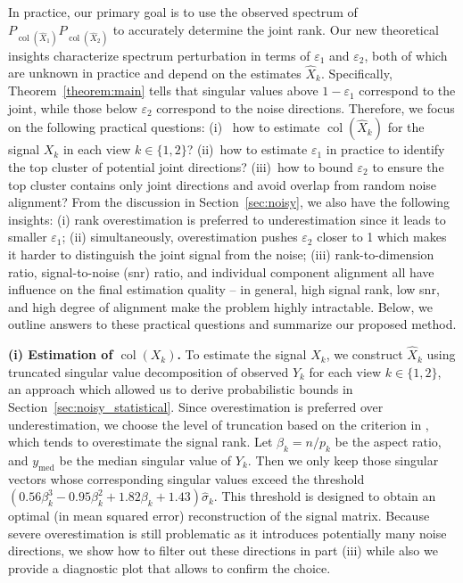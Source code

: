\documentclass{amsart}
\def\v{{\varepsilon}}
\DeclareMathOperator*{\col}{col}
\begin{document}
 In practice, our primary goal is to use the observed spectrum of $P_{\col (\widehat{X}_1)} P_{\col (\widehat{X}_2)}$ to accurately determine the joint rank. Our new theoretical insights characterize spectrum perturbation in terms of $\varepsilon_1$ and $\varepsilon_2$, both of which are unknown in practice { and depend on the estimates $\widehat X_k$.} {Specifically, Theorem~\ref{theorem:main} tells that singular values above $1-\varepsilon_1$} correspond to the joint, while those below $\varepsilon_2$ correspond to the noise directions. Therefore, we focus on the following practical questions: (i)~{ how to estimate $\col (\widehat{X}_k)$ for the signal $X_k$} in each view $k\in \{1,2\}$? (ii)~how to estimate $\varepsilon_1$ in practice to identify the top cluster of potential joint directions? (iii)~how to bound $\varepsilon_2$ to ensure the top cluster contains only joint directions and avoid overlap from random noise alignment? {From the discussion in Section~\ref{sec:noisy}, we also have the following insights: (i) rank overestimation is preferred to underestimation since it leads to smaller $\varepsilon_1$; (ii) simultaneously, overestimation pushes $\varepsilon_2$ closer to 1 which makes it harder to distinguish the joint signal from the noise; (iii) rank-to-dimension ratio, signal-to-noise (snr) ratio, and individual component alignment all have influence on the final estimation quality -- in general, high signal rank, low snr, and high degree of alignment make the problem highly intractable.} Below, we outline answers to these practical questions and summarize our proposed method.



\textbf{(i) Estimation of $\col(X_k)$.}
\label{sec:obtaining_estimates}
To estimate the signal $X_k$, we construct $\widehat{X}_k$ using truncated singular value decomposition of observed $Y_k$  for each view $k \in \{1,2\}${, an approach which allowed us to derive probabilistic bounds in Section~\ref{sec:noisy_statistical}}. {Since overestimation is preferred over underestimation, we choose the level of truncation based on the criterion in \cite{gavish2014optimal}, which tends to overestimate the signal rank.} Let $\beta_k = n / p_k$ be the aspect ratio, and %
$y_{\text{med}}$ be the median singular value of $Y_k$. %
Then we only keep those singular vectors whose corresponding singular values exceed the threshold $(0.56\beta_k^3 - 0.95\beta_k^2 + 1.82\beta_k + 1.43) \widehat{\sigma}_k$. This threshold is designed to obtain an optimal (in mean squared error) reconstruction of the signal matrix. {Because severe overestimation is still problematic as it introduces potentially many noise directions, we show how to filter out these directions in part (iii) while also we provide a diagnostic plot that allows to confirm the choice.}
\end{document}
